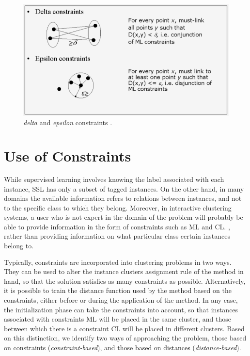 \begin{figure}[!h]
	\centering
	\includegraphics[scale=0.45]{gfx/ConstClust/RestriccionesDeltaEpsilon.png} 
	\caption[\textit{delta} and \textit{epsilon} constraints]{\textit{delta} and \textit{epsilon} constraints \cite{davidson2007survey}.}\label{fig:DistanceConstraints}
\end{figure}


\section{Use of Constraints}

While supervised learning involves knowing the label associated with each instance, \acf{SSL} has only a subset of tagged instances. On the other hand, in many domains the available information refers to relations between instances, and not to the specific class to which they belong. Moreover, in interactive clustering systems, a user who is not expert in the domain of the problem will probably be able to provide information in the form of constraints such as \acf{ML} and \acf{CL}. \cite{cohn2003semi}\cite{davidson2007hierarchical}, rather than providing information on what particular class certain instances belong to.

Typically, constraints are incorporated into clustering problems in two ways. They can be used to alter the instance clusters assignment rule of the method in hand, so that the solution satisfies as many constraints as possible. Alternatively, it is possible to train the distance function used by the method based on the constraints, either before or during the application of the method. In any case, the initialization phase can take the constraints into account, so that instances associated with constraints \acf{ML} will be placed in the same cluster, and those between which there is a constraint \acf{CL} will be placed in different clusters. Based on this distinction, we identify two ways of approaching the problem, those based on constraints (\textit{constraint-based}), and those based on distances (\textit{distance-based}).

